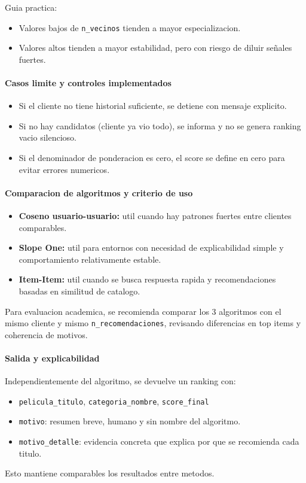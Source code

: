 ﻿\documentclass{article}
\begin{document}
Guia practica:
\begin{itemize}
    \item Valores bajos de \texttt{n\_vecinos} tienden a mayor especializacion.
    \item Valores altos tienden a mayor estabilidad, pero con riesgo de diluir señales fuertes.
\end{itemize}

\paragraph{Casos limite y controles implementados}
\begin{itemize}
    \item Si el cliente no tiene historial suficiente, se detiene con mensaje explicito.
    \item Si no hay candidatos (cliente ya vio todo), se informa y no se genera ranking vacio silencioso.
    \item Si el denominador de ponderacion es cero, el score se define en cero para evitar errores numericos.
\end{itemize}

\paragraph{Comparacion de algoritmos y criterio de uso}
\begin{itemize}
    \item \textbf{Coseno usuario-usuario:} util cuando hay patrones fuertes entre clientes comparables.
    \item \textbf{Slope One:} util para entornos con necesidad de explicabilidad simple y comportamiento relativamente estable.
    \item \textbf{Item-Item:} util cuando se busca respuesta rapida y recomendaciones basadas en similitud de catalogo.
\end{itemize}

Para evaluacion academica, se recomienda comparar los 3 algoritmos con el mismo cliente y mismo \texttt{n\_recomendaciones}, revisando diferencias en top items y coherencia de motivos.

\paragraph{Salida y explicabilidad}
Independientemente del algoritmo, se devuelve un ranking con:
\begin{itemize}
    \item \texttt{pelicula\_titulo}, \texttt{categoria\_nombre}, \texttt{score\_final}
    \item \texttt{motivo}: resumen breve, humano y sin nombre del algoritmo.
    \item \texttt{motivo\_detalle}: evidencia concreta que explica por que se recomienda cada titulo.
\end{itemize}
Esto mantiene comparables los resultados entre metodos.
\end{document}
